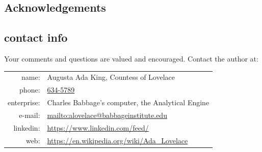 \documentclass{sugconf}%
\begin{document}
\subsection{Acknowledgements}%

\subsection{contact info}%

Your comments and questions are valued and encouraged. Contact the author at:

\begin{center}
\begin{tabular}[h]{rl}
name:      & Augusta Ada King, Countess of Lovelace\\
phone:     &\href{https://www.youtube.com/watch?v=KOUNkVsx1-s}{634-5789} \\ %
enterprise:& Charles Babbage's computer, the Analytical Engine\\ %
e-mail:    &\url{mailto:alovelace@babbageinstitute.edu}\\
linkedin:  &\url{https://www.linkedin.com/feed/}\\
web:       &\url{https://en.wikipedia.org/wiki/Ada_Lovelace}\\ %
\end{tabular}
\end{center}

\vfill
\SASisRegisteredTrademark %
\vfill \OtherTrademarks %
\end{document}
